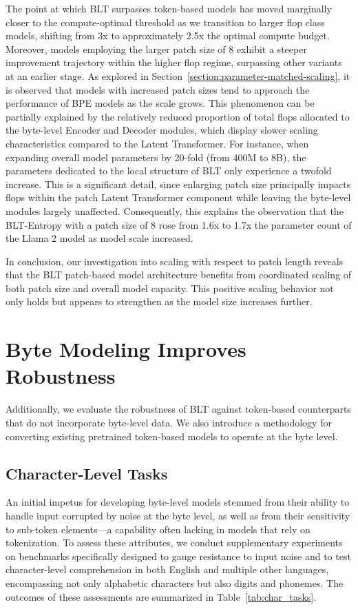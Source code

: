 The point at which {\textsc BLT} surpasses token-based models has moved marginally closer to the compute-optimal threshold as we transition to larger flop class models, shifting from 3x to approximately 2.5x the optimal compute budget. Moreover, models employing the larger patch size of 8 exhibit a steeper improvement trajectory within the higher flop regime, surpassing other variants at an earlier stage. As explored in Section~\ref{section:parameter-matched-scaling}, it is observed that models with increased patch sizes tend to approach the performance of BPE models as the scale grows. This phenomenon can be partially explained by the relatively reduced proportion of total flops allocated to the byte-level Encoder and Decoder modules, which display slower scaling characteristics compared to the Latent Transformer. For instance, when expanding overall model parameters by 20-fold (from 400M to 8B), the parameters dedicated to the local structure of {\textsc BLT} only experience a twofold increase. This is a significant detail, since enlarging patch size principally impacts flops within the patch Latent Transformer component while leaving the byte-level modules largely unaffected. Consequently, this explains the observation that the {\textsc BLT}-Entropy with a patch size of 8 rose from 1.6x to 1.7x the parameter count of the Llama 2 model as model scale increased.

In conclusion, our investigation into scaling with respect to patch length reveals that the {\textsc BLT} patch-based model architecture benefits from coordinated scaling of both patch size and overall model capacity. This positive scaling behavior not only holds but appears to strengthen as the model size increases further.

\section{Byte Modeling Improves Robustness}
Additionally, we evaluate the robustness of {\textsc BLT} against token-based counterparts that do not incorporate byte-level data. We also introduce a methodology for converting existing pretrained token-based models to operate at the byte level.
\label{sec:robustness}

\subsection{Character-Level Tasks}

An initial impetus for developing byte-level models stemmed from their ability to handle input corrupted by noise at the byte level, as well as from their sensitivity to sub-token elements—a capability often lacking in models that rely on tokenization. To assess these attributes, we conduct supplementary experiments on benchmarks specifically designed to gauge resistance to input noise and to test character-level comprehension in both English and multiple other languages, encompassing not only alphabetic characters but also digits and phonemes. The outcomes of these assessments are summarized in Table~\ref{tab:char_tasks}.


